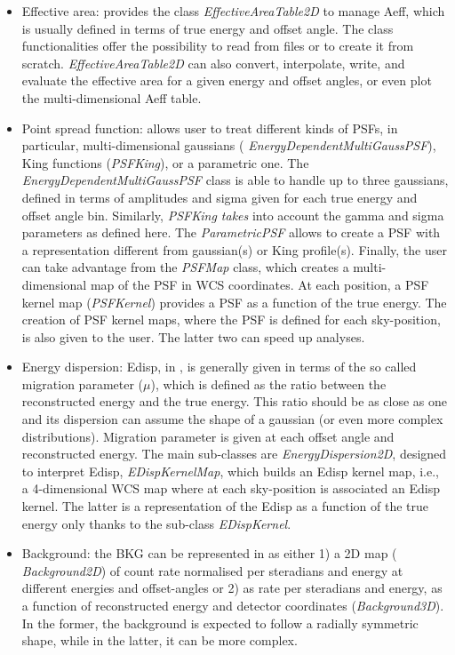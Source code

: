 \begin{itemize}
	\item Effective area: \gammapy provides the class {\it EffectiveAreaTable2D} to
	      manage Aeff, which is usually defined in terms of true energy and offset angle.
	      The class functionalities offer the possibility to read from files or to create
	      it from scratch. {\it EffectiveAreaTable2D} can also convert, interpolate,
	      write, and evaluate the effective area for a given energy and offset angles, or
	      even plot the multi-dimensional Aeff table.

	\item Point spread function: \gammapy allows user to treat different kinds of PSFs,
	      in particular, multi-dimensional gaussians ({\it
			      EnergyDependentMultiGaussPSF}), King functions ({\it PSFKing}), or a parametric
	      one. The {\it EnergyDependentMultiGaussPSF} class is able to handle up to three
	      gaussians, defined in terms of amplitudes and sigma given for each true energy
	      and offset angle bin. Similarly, {\it PSFKing takes} into account the gamma and
	      sigma parameters as defined here. The {\it ParametricPSF} allows to create a
	      PSF with a representation different from gaussian(s) or King profile(s).
	      Finally, the user can take advantage from the {\it PSFMap} class, which creates
	      a multi-dimensional map of the PSF in WCS coordinates. At each position, a PSF
	      kernel map ({\it PSFKernel}) provides a PSF as a function of the true energy.
	      The creation of PSF kernel maps, where the PSF is defined for each
	      sky-position, is also given to the user. The latter two can speed up analyses.

	\item Energy dispersion: Edisp, in \iact, is generally given in terms of the so
	      called migration parameter ($\mu$), which is defined as the ratio between the
	      reconstructed energy and the true energy. This ratio should be as close as one
	      and its dispersion can assume the shape of a gaussian (or even more complex
	      distributions). Migration parameter is given at each offset angle and
	      reconstructed energy. The main sub-classes are {\it EnergyDispersion2D},
	      designed to interpret Edisp, {\it EDispKernelMap}, which builds an Edisp kernel
	      map, i.e., a 4-dimensional WCS map where at each sky-position is associated an
	      Edisp kernel. The latter is a representation of the Edisp as a function of the
	      true energy only thanks to the sub-class {\it EDispKernel}.

	\item Background: the BKG can be represented in \gammapy as either 1) a 2D map ({\it
			      Background2D}) of count rate normalised per steradians and energy at different
	      energies and offset-angles or 2) as rate per steradians and energy, as a
	      function of reconstructed energy and detector coordinates ({\it Background3D}).
	      In the former, the background is expected to follow a radially symmetric shape,
	      while in the latter, it can be more complex.

\end{itemize}


